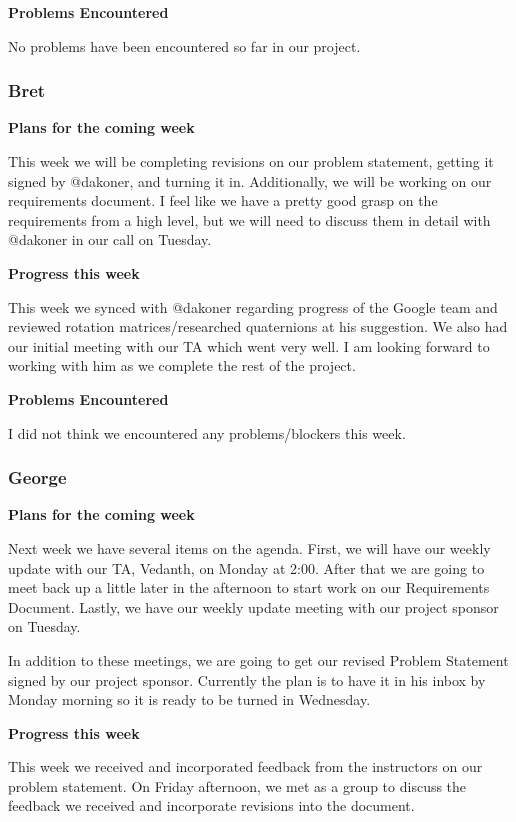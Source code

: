 \documentclass[10pt, onecolumn, draftclsnofoot, letterpaper, compsoc]{IEEEtran}
\begin{document}
    \noindent \textbf{Problems Encountered}

    No problems have been encountered so far in our project.

    \subsubsection{Bret}

    \noindent \textbf{Plans for the coming week}

    This week we will be completing revisions on our problem statement, getting
    it signed by @dakoner, and turning it in. Additionally, we will be working
    on our requirements document. I feel like we have a pretty good grasp on the
    requirements from a high level, but we will need to discuss them in detail with
    @dakoner in our call on Tuesday.

    \noindent \textbf{Progress this week}

    This week we synced with @dakoner regarding progress of the Google team and
    reviewed rotation matrices/researched quaternions at his suggestion. We also
    had our initial meeting with our TA which went very well. I am looking forward
    to working with him as we complete the rest of the project.

    \noindent \textbf{Problems Encountered}

    I did not think we encountered any problems/blockers this week.

    \subsubsection{George}

    \noindent \textbf{Plans for the coming week}

    Next week we have several items on the agenda. First, we will have our weekly
    update with our TA, Vedanth, on Monday at 2:00. After that we are going to meet
    back up a little later in the afternoon to start work on our Requirements
    Document. Lastly, we have our weekly update meeting with our project sponsor on Tuesday.

    In addition to these meetings, we are going to get our revised Problem Statement
    signed by our project sponsor. Currently the plan is to have it in his inbox by
    Monday morning so it is ready to be turned in Wednesday.

    \noindent \textbf{Progress this week}

    This week we received and incorporated feedback from the instructors on our
    problem statement. On Friday afternoon, we met as a group to discuss the feedback
    we received and incorporate revisions into the document.
\end{document}
